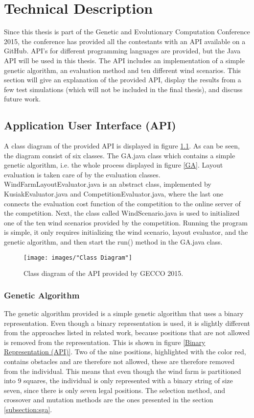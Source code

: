 \chapter{Technical Description}


Since this thesis is part of the Genetic and Evolutionary Computation Conference 2015, the conference has provided all the contestants with an API available on a GitHub. API's for different programming languages are provided, but the Java API will be used in this thesis. The API includes an implementation of a simple genetic algorithm, an evaluation method and ten different wind scenarios. This section will give an explanation of the provided API, display the results from a few test simulations (which will not be included in the final thesis), and discuss future work.


\section{Application User Interface (API)}
A class diagram of the provided API is displayed in figure \ref{Class Diagram}. As can be seen, the diagram consist of six classes. The GA.java class which contains a simple genetic algorithm, i.e. the whole process displayed in figure \ref{GA}. Layout evaluation is taken care of by the evaluation classes. WindFarmLayoutEvaluator.java is an abstract class, implemented by KusiakEvaluator.java and CompetitionEvaluator.java, where the last one connects the evaluation cost function of the competition to the online server of the competition. Next, the class called WindScenario.java is used to initialized one of the ten wind scenarios provided by the competition. Running the program is simple, it only requires initializing the wind scenario, layout evaluator, and the genetic algorithm, and then start the run() method in the GA.java class.


\begin{figure}[h!]
\begin{center}
\texttt{[image: images/"Class Diagram"]}
\caption{Class diagram of the API provided by GECCO 2015.}
\label{Class Diagram}
\end{center}
\end{figure}


\subsection{Genetic Algorithm}
The genetic algorithm provided is a simple genetic algorithm that uses a binary representation. Even though a binary representation is used, it is slightly different from the approaches listed in related work, because positions that are not allowed is removed from the representation. This is shown in figure \ref{Binary Representation (API)}. Two of the nine positions, highlighted with the color red, contains obstacles and are therefore not allowed, these are therefore removed from the individual. This means that even though the wind farm is partitioned into 9 squares, the individual is only represented with a binary string of size seven, since there is only seven legal positions. The selection method, and crossover and mutation methods are the ones presented in the section \ref{subsection:sga}.


